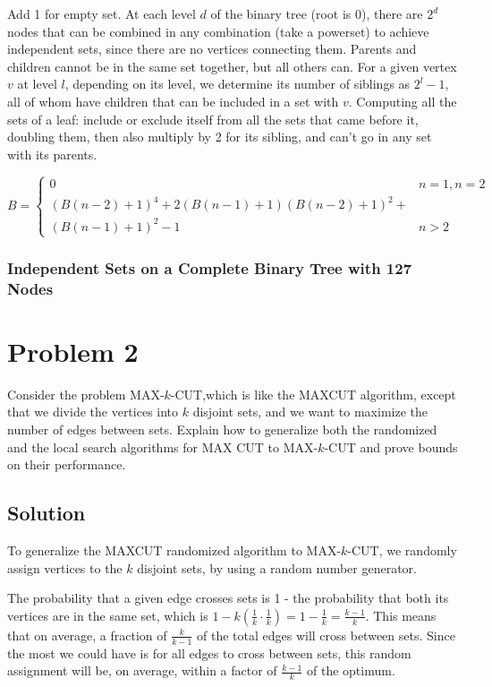 \documentclass[11pt]{article}
\begin{document}
Add 1 for empty set. At each level $d$ of the binary tree (root is 0), there are $2^d$ nodes that can be combined in any combination (take a powerset) to achieve independent sets, since there are no vertices connecting them.
Parents and children cannot be in the same set together, but all others can. For a given vertex $v$ at level $l$, depending on its level, we determine its number of siblings as $2^l - 1$, all of whom have children that can be included in a set with $v$. 
Computing all the sets of a leaf: include or exclude itself from all the sets that came before it, doubling them, then also multiply by 2 for its sibling, and can't go in any set with its parents. 

$$ B = 
\begin{cases}
	0 & n = 1, n = 2\\
	{(B(n-2) + 1)}^4 + 2(B(n - 1)+1){(B(n-2) + 1)}^2 + \\(B(n-1) + 1)^2 - 1 & n > 2
\end{cases}
$$



\subsubsection{Independent Sets on a Complete Binary Tree with 127 Nodes}

\section{Problem 2}
Consider the problem MAX-$k$-CUT,which is like the MAXCUT algorithm, except that we divide the vertices into $k$ disjoint sets, and we want to maximize the number of edges between sets. Explain how to generalize both the randomized and the local search algorithms for MAX CUT to MAX-$k$-CUT and prove bounds on their performance.
\subsection{Solution}
To generalize the MAXCUT randomized algorithm to MAX-$k$-CUT, we randomly assign vertices to the $k$ disjoint sets, by using a random number generator. 

The probability that a given edge crosses sets is 1 - the probability that both its vertices are in the same set, which is $1- k(\frac{1}{k}\cdot\frac{1}{k})= 1 - \frac{1}{k} = \frac{k-1}{k}$. This means that on average, a fraction of $\frac{k}{k-1}$ of the total edges will cross between sets. Since the most we could have is for all edges to cross between sets, this random assignment will be, on average, within a factor of $\frac{k-1}{k}$ of the optimum.
\end{document}
